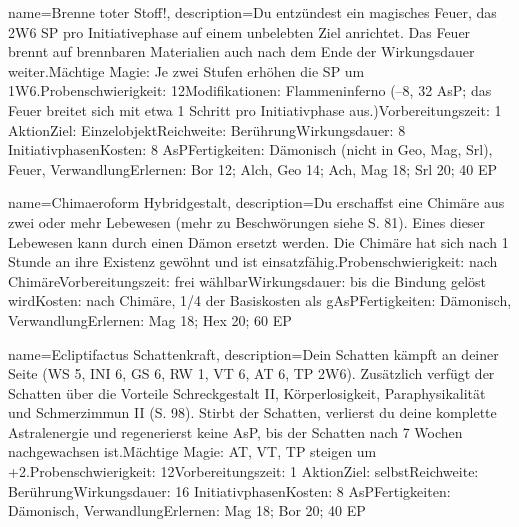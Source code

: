 {
    name={Brenne toter Stoff!},
    description={Du entzündest ein magisches Feuer, das 2W6 SP pro Initiativephase auf einem unbelebten Ziel anrichtet. Das Feuer brennt auf brennbaren Materialien auch nach dem Ende der Wirkungsdauer weiter.\newline Mächtige Magie: Je zwei Stufen erhöhen die SP um 1W6.\newline Probenschwierigkeit: 12\newline Modifikationen: Flammeninferno (–8, 32 AsP; das Feuer breitet sich mit etwa 1 Schritt pro Initiativphase aus.)\newline Vorbereitungszeit: 1 Aktion\newline Ziel: Einzelobjekt\newline Reichweite: Berührung\newline Wirkungsdauer: 8 Initiativphasen\newline Kosten: 8 AsP\newline Fertigkeiten: Dämonisch (nicht in Geo, Mag, Srl), Feuer, Verwandlung\newline Erlernen: Bor 12; Alch, Geo 14; Ach, Mag 18; Srl 20; 40 EP}
}


{
    name={Chimaeroform Hybridgestalt},
    description={Du erschaffst eine Chimäre aus zwei oder mehr Lebewesen (mehr zu Beschwörungen siehe S. 81). Eines dieser Lebewesen kann durch einen Dämon ersetzt werden. Die Chimäre hat sich nach 1 Stunde an ihre Existenz gewöhnt und ist einsatzfähig.\newline Probenschwierigkeit: nach Chimäre\newline Vorbereitungszeit: frei wählbar\newline Wirkungsdauer: bis die Bindung gelöst wird\newline Kosten: nach Chimäre, 1/4 der Basiskosten als gAsP\newline Fertigkeiten: Dämonisch, Verwandlung\newline Erlernen: Mag 18; Hex 20; 60 EP}
}


{
    name={Ecliptifactus Schattenkraft},
    description={Dein Schatten kämpft an deiner Seite (WS 5, INI 6, GS 6, RW 1, VT 6, AT 6, TP 2W6). Zusätzlich verfügt der Schatten über die Vorteile Schreckgestalt II, Körperlosigkeit, Paraphysikalität und Schmerzimmun II (S. 98). Stirbt der Schatten, verlierst du deine komplette Astralenergie und regenerierst keine AsP, bis der Schatten nach 7 Wochen nachgewachsen ist.\newline Mächtige Magie: AT, VT, TP steigen um +2.\newline Probenschwierigkeit: 12\newline Vorbereitungszeit: 1 Aktion\newline Ziel: selbst\newline Reichweite: Berührung\newline Wirkungsdauer: 16 Initiativphasen\newline Kosten: 8 AsP\newline Fertigkeiten: Dämonisch, Verwandlung\newline Erlernen: Mag 18; Bor 20; 40 EP}
}


